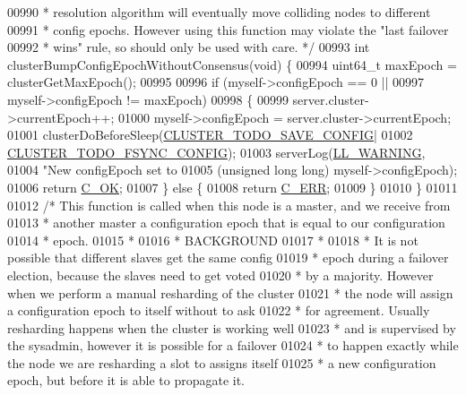 \begin{DoxyCode}
{{{{{{{{{{{{00990 \textcolor{comment}{ * resolution algorithm will eventually move colliding nodes to different}
00991 \textcolor{comment}{ * config epochs. However using this function may violate the "last failover}
00992 \textcolor{comment}{ * wins" rule, so should only be used with care. */}
00993 \textcolor{keywordtype}{int} clusterBumpConfigEpochWithoutConsensus(\textcolor{keywordtype}{void}) \{
00994     uint64\_t maxEpoch = clusterGetMaxEpoch();
00995 
00996     \textcolor{keywordflow}{if} (myself->configEpoch == 0 ||
00997         myself->configEpoch != maxEpoch)
00998     \{
00999         server.cluster->currentEpoch++;
01000         myself->configEpoch = server.cluster->currentEpoch;
01001         clusterDoBeforeSleep(\hyperlink{cluster_8h_a0ae5ff08fbae3c655012b4de8bfc327d}{CLUSTER\_TODO\_SAVE\_CONFIG}|
01002                              \hyperlink{cluster_8h_accc9a00230cd04789db2398bb3ab715a}{CLUSTER\_TODO\_FSYNC\_CONFIG});
01003         serverLog(\hyperlink{server_8h_a31229b9334bba7d6be2a72970967a14b}{LL\_WARNING},
01004             \textcolor{stringliteral}{"New configEpoch set to %
01005             (\textcolor{keywordtype}{unsigned} \textcolor{keywordtype}{long} \textcolor{keywordtype}{long}) myself->configEpoch);
01006         \textcolor{keywordflow}{return} \hyperlink{server_8h_a303769ef1065076e68731584e758d3e1}{C\_OK};
01007     \} \textcolor{keywordflow}{else} \{
01008         \textcolor{keywordflow}{return} \hyperlink{server_8h_af98ac28d5f4d23d7ed5985188e6fb7d1}{C\_ERR};
01009     \}
01010 \}
01011 
01012 \textcolor{comment}{/* This function is called when this node is a master, and we receive from}
01013 \textcolor{comment}{ * another master a configuration epoch that is equal to our configuration}
01014 \textcolor{comment}{ * epoch.}
01015 \textcolor{comment}{ *}
01016 \textcolor{comment}{ * BACKGROUND}
01017 \textcolor{comment}{ *}
01018 \textcolor{comment}{ * It is not possible that different slaves get the same config}
01019 \textcolor{comment}{ * epoch during a failover election, because the slaves need to get voted}
01020 \textcolor{comment}{ * by a majority. However when we perform a manual resharding of the cluster}
01021 \textcolor{comment}{ * the node will assign a configuration epoch to itself without to ask}
01022 \textcolor{comment}{ * for agreement. Usually resharding happens when the cluster is working well}
01023 \textcolor{comment}{ * and is supervised by the sysadmin, however it is possible for a failover}
01024 \textcolor{comment}{ * to happen exactly while the node we are resharding a slot to assigns itself}
01025 \textcolor{comment}{ * a new configuration epoch, but before it is able to propagate it.}
}}}}}}}}}}}}}
\end{DoxyCode}
